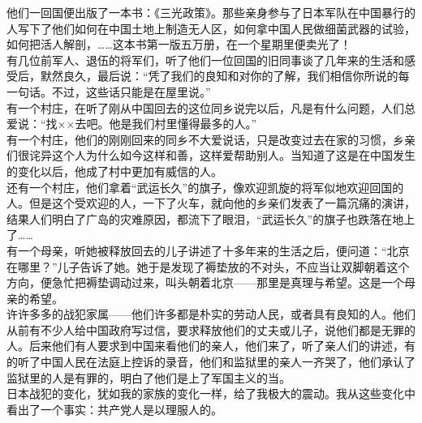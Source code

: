 他们一回国便出版了一本书：《三光政策》。那些亲身参与了日本军队在中国暴行的人写下了他们如何在中国土地上制造无人区，如何拿中国人民做细菌武器的试验，如何把活人解剖，……这本书第一版五万册，在一个星期里便卖光了！\\

有几位前军人、退伍的将军们，听了他们一位回国的旧同事谈了几年来的生活和感受后，默然良久，最后说：“凭了我们的良知和对你的了解，我们相信你所说的每一句话。不过，这些话只能是在屋里说。”\\

有一个村庄，在听了刚从中国回去的这位同乡说完以后，凡是有什么问题，人们总爱说：“找××去吧。他是我们村里懂得最多的人。”\\

有一个村庄，他们的刚刚回来的同乡不大爱说话，只是改变过去在家的习惯，乡亲们很诧异这个人为什么如今这样和善，这样爱帮助别人。当知道了这是在中国发生的变化以后，他成了村中更加有威信的人。\\

还有一个村庄，他们拿着“武运长久”的旗子，像欢迎凯旋的将军似地欢迎回国的人。但是这个受欢迎的人，一下了火车，就向他的乡亲们发表了一篇沉痛的演讲，结果人们明白了广岛的灾难原因，都流下了眼泪，“武运长久”的旗子也跌落在地上了……\\

有一个母亲，听她被释放回去的儿子讲述了十多年来的生活之后，便问道：“北京在哪里？”儿子告诉了她。她于是发现了褥垫放的不对头，不应当让双脚朝着这个方向，便急忙把褥垫调动过来，叫头朝着北京——那里是真理与希望。这是一个母亲的希望。\\

许许多多的战犯家属——他们许多都是朴实的劳动人民，或者具有良知的人。他们从前有不少人给中国政府写过信，要求释放他们的丈夫或儿子，说他们都是无罪的人。后来他们有人要求到中国来看他们的亲人，他们来了，听了亲人们的讲述，有的听了中国人民在法庭上控诉的录音，他们和监狱里的亲人一齐哭了，他们承认了监狱里的人是有罪的，明白了他们是上了军国主义的当。\\

日本战犯的变化，犹如我的家族的变化一样，给了我极大的震动。我从这些变化中看出了一个事实：共产党人是以理服人的。
